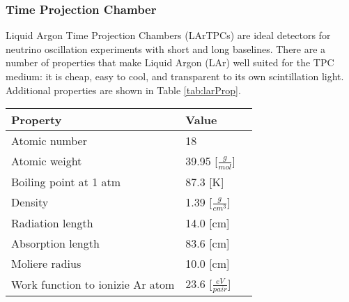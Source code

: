 \subsubsection{Time Projection Chamber} 
\par Liquid Argon Time Projection Chambers (LArTPCs) are ideal detectors for neutrino oscillation experiments with short and long baselines.  There are a number of properties that make Liquid Argon (LAr) well suited for the TPC medium: it is cheap, easy to cool, and transparent to its own scintillation light.  Additional properties are shown in Table \ref{tab:larProp}.  

\begin{table}[H]
\centering
{} 
 \begin{tabular}{| l | l | l |}
 \hline
 Property & Value \\ [0.1ex] \hline \hline 
 Atomic number & 18 \\ \hline
 Atomic weight & 39.95 [$\frac{g}{mol}$] \\ \hline
 Boiling point at 1 atm & 87.3 [K] \\ \hline
 Density & 1.39 [$\frac{g}{cm^3}$] \\ \hline
 Radiation length & 14.0 [cm] \\ \hline
Absorption length & 83.6 [cm] \\ \hline
 Moliere radius & 10.0 [cm] \\ \hline 
 Work function to ionizie Ar atom  & 23.6 [$\frac{eV}{pair}$] \\
\hline
\end{tabular}
\end{table}

